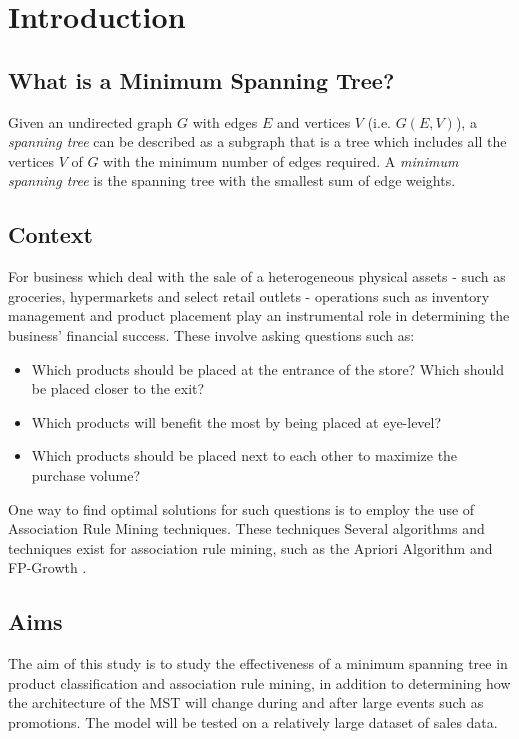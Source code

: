 \documentclass[a4paper,11pt]{article}
\begin{document}
\newpage
\tableofcontents
\newpage

\section{Introduction}
\subsection{What is a Minimum Spanning Tree?}
Given an undirected graph $G$ with edges $E$ and vertices $V$ (i.e. $G(E,V)$), a \textit{spanning tree} can be described as a subgraph that is a tree \cite{tree} which includes all the vertices $V$ of $G$ with the minimum number of edges required. A \textit{minimum spanning tree} is the spanning tree with the smallest sum of edge weights.

\subsection{Context}
For business which deal with the sale of a heterogeneous physical assets - such as groceries, hypermarkets and select retail outlets - operations such as inventory management and product placement play an instrumental role in determining the business' financial success. These involve asking questions such as:
\begin{itemize}
\item Which products should be placed at the entrance of the store? Which should be placed closer to the exit?
\item Which products will benefit the most by being placed at eye-level?
\item Which products should be placed next to each other to maximize the purchase volume?
\end{itemize}
One way to find optimal solutions for such questions is to employ the use of Association Rule Mining techniques. These techniques 
Several algorithms and techniques exist for association rule mining, such as the Apriori Algorithm \cite{apriori} and FP-Growth \cite{fp_growth}.

\subsection{Aims}
The aim of this study is to study the effectiveness of a minimum spanning tree in product classification and association rule mining,  in addition to determining how the architecture of the MST will change during and after large events such as promotions. The model will be tested on a relatively large dataset of sales data.
\end{document}
